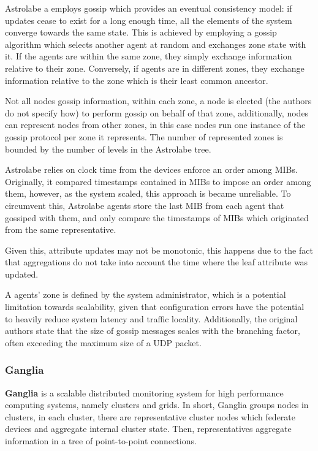 Astrolabe a employs gossip which provides an eventual consistency model: if updates cease to exist for a long enough time, all the elements of the system  converge towards the same state. This is achieved by employing a gossip algorithm which selects another agent at random and exchanges zone state with it. If the agents are within the same zone, they simply exchange information relative to their zone. Conversely, if agents are in different zones, they exchange information relative to the zone which is their least common ancestor.

Not all nodes gossip information, within each zone, a node is elected (the authors do not specify how) to perform gossip on behalf of that zone, additionally, nodes can represent nodes from other zones, in this case nodes run one instance of the gossip protocol per zone it represents. The number of represented zones is bounded by the number of levels in the Astrolabe tree.

Astrolabe relies on clock time from the devices enforce an order among MIBs. Originally, it compared timestamps contained in MIBs to impose an order among them, however, as the system scaled, this approach is became unreliable. To circumvent this, Astrolabe agents store the last MIB from each agent that gossiped with them, and only compare the timestamps of MIBs which originated from the same representative.

Given this, attribute updates may not be monotonic, this happens due to the fact that aggregations do not take into account the time where the leaf attribute was updated. 

A agents' zone is defined by the system administrator, which is a potential limitation towards scalability, given that configuration errors have the potential to heavily reduce system latency and traffic locality. Additionally, the original authors state that the size of gossip messages scales with the branching factor, often exceeding the maximum size of a UDP packet. 

\subsubsection{Ganglia}

\textbf{Ganglia} is a scalable distributed monitoring system \cite{massie2004ganglia} for high performance computing systems, namely clusters and grids. In short, Ganglia groups nodes in clusters, in each cluster, there are representative cluster nodes which federate devices and aggregate internal cluster state. Then, representatives aggregate information in a tree of point-to-point connections.

